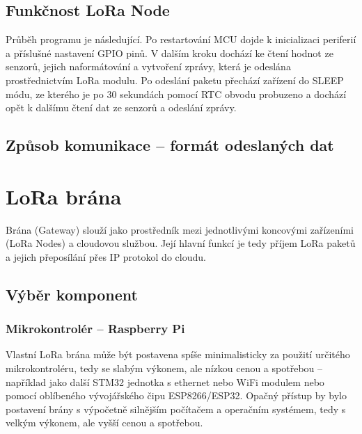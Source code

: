     

\subsection{Funkčnost LoRa Node}

    Průběh programu je následující. Po restartování MCU dojde k inicializaci periferií a příslušné nastavení GPIO pinů. V dalším kroku dochází ke čtení hodnot ze senzorů, jejich naformátování a vytvoření zprávy, která je odeslána prostřednictvím LoRa modulu. 
    Po odeslání paketu přechází zařízení do SLEEP módu, ze kterého je po 30 sekundách pomocí RTC obvodu probuzeno a dochází opět k dalšímu čtení dat ze senzorů a odeslání zprávy.

\subsection{Způsob komunikace – formát odeslaných dat}





\section{LoRa brána}

    
    

    Brána (Gateway) slouží jako prostředník mezi jednotlivými koncovými zařízeními (LoRa Nodes) a cloudovou službou. Její hlavní funkcí je tedy příjem LoRa paketů a jejich přeposílání přes IP protokol do cloudu.

\subsection{Výběr komponent}
    
    \subsubsection{Mikrokontrolér – Raspberry Pi}
        Vlastní LoRa brána může být postavena spíše minimalisticky za použití určitého mikrokontroléru, tedy se slabým výkonem, ale nízkou cenou a spotřebou – například jako další STM32 jednotka s ethernet nebo WiFi modulem nebo pomocí oblíbeného vývojářského čipu ESP8266/ESP32. 
        Opačný přístup by bylo postavení brány s výpočetně silnějším počítačem a operačním systémem, tedy s velkým výkonem, ale vyšší cenou a spotřebou.

